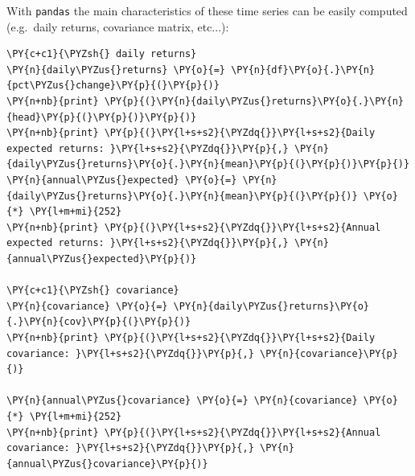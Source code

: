     With \texttt{pandas} the main characteristics of these time series can
be easily computed (e.g.~daily returns, covariance matrix, etc...):

    \begin{tcolorbox}[breakable, size=fbox, boxrule=1pt, pad at break*=1mm,colback=cellbackground, colframe=cellborder]
\begin{Verbatim}[commandchars=\\\{\}]
\PY{c+c1}{\PYZsh{} daily returns}
\PY{n}{daily\PYZus{}returns} \PY{o}{=} \PY{n}{df}\PY{o}{.}\PY{n}{pct\PYZus{}change}\PY{p}{(}\PY{p}{)}
\PY{n+nb}{print} \PY{p}{(}\PY{n}{daily\PYZus{}returns}\PY{o}{.}\PY{n}{head}\PY{p}{(}\PY{p}{)}\PY{p}{)}
\PY{n+nb}{print} \PY{p}{(}\PY{l+s+s2}{\PYZdq{}}\PY{l+s+s2}{Daily expected returns: }\PY{l+s+s2}{\PYZdq{}}\PY{p}{,} \PY{n}{daily\PYZus{}returns}\PY{o}{.}\PY{n}{mean}\PY{p}{(}\PY{p}{)}\PY{p}{)}
\PY{n}{annual\PYZus{}expected} \PY{o}{=} \PY{n}{daily\PYZus{}returns}\PY{o}{.}\PY{n}{mean}\PY{p}{(}\PY{p}{)} \PY{o}{*} \PY{l+m+mi}{252}
\PY{n+nb}{print} \PY{p}{(}\PY{l+s+s2}{\PYZdq{}}\PY{l+s+s2}{Annual expected returns: }\PY{l+s+s2}{\PYZdq{}}\PY{p}{,} \PY{n}{annual\PYZus{}expected}\PY{p}{)}

\PY{c+c1}{\PYZsh{} covariance}
\PY{n}{covariance} \PY{o}{=} \PY{n}{daily\PYZus{}returns}\PY{o}{.}\PY{n}{cov}\PY{p}{(}\PY{p}{)}
\PY{n+nb}{print} \PY{p}{(}\PY{l+s+s2}{\PYZdq{}}\PY{l+s+s2}{Daily covariance: }\PY{l+s+s2}{\PYZdq{}}\PY{p}{,} \PY{n}{covariance}\PY{p}{)}

\PY{n}{annual\PYZus{}covariance} \PY{o}{=} \PY{n}{covariance} \PY{o}{*} \PY{l+m+mi}{252}
\PY{n+nb}{print} \PY{p}{(}\PY{l+s+s2}{\PYZdq{}}\PY{l+s+s2}{Annual covariance: }\PY{l+s+s2}{\PYZdq{}}\PY{p}{,} \PY{n}{annual\PYZus{}covariance}\PY{p}{)}


\end{Verbatim}
\end{tcolorbox}

